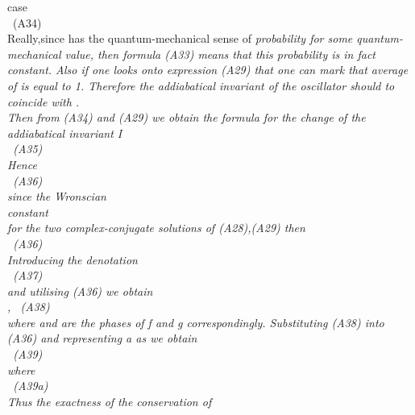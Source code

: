 \documentclass[a4paper,12pt] {article}
\begin{document}
case \\\coordHE{} \ (A34) \\ Really,since \coordHE{} has the
quantum-mechanical sense of \it probability \rm  for  some quantum-mechanical value, then formula
 (A33) means \it that this probability \rm  {}\coordHE{} \it is in fact constant. \rm Also if one looks
onto  expression (A29) that one can mark that average of \coordHE{}  is equal to 1.     Therefore
the addiabatical invariant of the oscillator should to coincide with \coordHE{}.\\ Then from (A34)
and (A29) we obtain the formula for the change of the addiabatical invariant I
 \\\coordHE{} \ (A35)\\ Hence
\\ \coordHE{} \ (A36)\\ since the Wronscian
\\ \myHighlight{$ \Psi^* \dot \Psi- \dot \Psi^* \Psi =$}\coordHE{} constant \\ for the two complex-conjugate solutions of
 (A28),(A29) then \\\coordHE{} \ (A36)\\ Introducing the denotation \\ \coordHE{} \ (A37)\\
and utilising (A36) we obtain \\\coordHE{},\coordHE{} \ (A38)\\ where \coordHE{} and \coordHE{} are the phases of f and g correspondingly. Substituting  (A38) into (A36) and representing a as \coordHE{} we obtain \\ \coordHE{} \ (A39)
\\ where \\ \coordHE{} \ (A39a)\\ Thus \it the exactness of the conservation of
\end{document}
